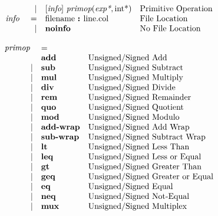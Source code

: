 \documentclass[12pt]{article}
\begin{document}
\[
\begin{array}{rrll}
                &\vert &[\text{\em info}]\  \text{\em primop}(\text{\em exp*}, \text{int}\text{*})                                 &\text{Primitive Operation}\\
\text{\em info\ }       &=     &\text{filename } \text{\bf :\ } \text{line} . \text{col}                              &\text{File Location}\\
                &\vert &\text{\bf noinfo\ }                                                                   &\text{No File Location}\\
\end{array}
\]

\[
\begin{array}{rll}
\text{\em primop\ }     &= \\
                &\text{\bf add}            &\text{Unsigned/Signed Add}\\
\vert           &\text{\bf sub}            &\text{Unsigned/Signed Subtract}\\
\vert           &\text{\bf mul}            &\text{Unsigned/Signed Multiply}\\
\vert           &\text{\bf div}            &\text{Unsigned/Signed Divide}\\
\vert           &\text{\bf rem}            &\text{Unsigned/Signed Remainder}\\
\vert           &\text{\bf quo}            &\text{Unsigned/Signed Quotient}\\
\vert           &\text{\bf mod}            &\text{Unsigned/Signed Modulo}\\
\vert           &\text{\bf add-wrap}       &\text{Unsigned/Signed Add Wrap}\\
\vert           &\text{\bf sub-wrap}       &\text{Unsigned/Signed Subtract Wrap}\\
\vert           &\text{\bf lt}             &\text{Unsigned/Signed Less Than}\\
\vert           &\text{\bf leq}            &\text{Unsigned/Signed Less or Equal}\\
\vert           &\text{\bf gt}             &\text{Unsigned/Signed Greater Than}\\
\vert           &\text{\bf geq}            &\text{Unsigned/Signed Greater or Equal}\\
\vert           &\text{\bf eq}             &\text{Unsigned/Signed Equal}\\
\vert           &\text{\bf neq}            &\text{Unsigned/Signed Not-Equal}\\
\vert           &\text{\bf mux}            &\text{Unsigned/Signed Multiplex}\\

\end{array}\]
\end{document}

